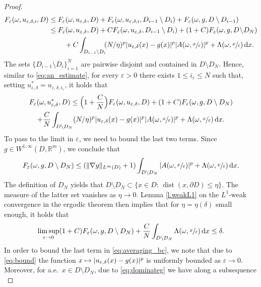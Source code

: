 \documentclass[10pt]{amsart}
\def\mto{\mathchoice{\longmapsto}{\mapsto}{\mapsto}{\mapsto}}
\theoremstyle{definition}
\let\e\varepsilon
\let\w\omega
\newcommand{\dx}{\,\mathrm{d}x}
\DeclareMathOperator{\dist}{dist}
\newcommand{\R}{\mathbb{R}}
\begin{document}
\begin{proof}
\begin{align*}
F_{\e}(\w,u_{\e,\delta,i},D)&\leq F_{\e}(\w,u_{\e,\delta},D)+F_{\e}(\w,u_{\e,\delta,i},D_{i-1}\setminus D_i)+F_{\e}(\w,g,D\setminus D_{i-1})
\\
&\leq F_{\e}(\w,u_{\e,\delta},D)+C F_{\e}(\w,u_{\e,\delta},D_{i-1}\setminus D_i)+(1+C)F_{\e}(\w,g,D\!\setminus\! D_N)
\\
&\hspace*{.8cm} +C\int_{D_{i-1}\setminus D_i}\hspace*{-1mm}(N/\eta)^p |u_{\e,\delta}(x)-g(x)|^p|A(\w,\sfrac{x}{\e})|^p+\Lambda(\w,\sfrac{x}{\e})\dx.
\end{align*}
The sets $\{D_{i-1}\setminus D_i\}_{i=1}^N$ are pairwise disjoint and contained in $D\setminus D_N$. Hence, similar to \eqref{eq:an_estimate}, for every $\e>0$ there exists $1\leq i_{\e}\leq N$ such that, setting $u^*_{\e,\delta}=u_{\e,\delta,i_{\e}}$, it holds that
\begin{multline}\label{eq:averaging_bc}
F_{\e}(\w,u_{\e,\delta}^*,D)\leq \Bigl(1+\frac{C}{N}\Bigr)F_{\e}(\w,u_{\e,\delta},D)+(1+C)F_{\e}(\w,g,D\setminus D_N)
\\
+\frac{C}{N}\int_{D\setminus D_N}(N/\eta)^p |u_{\e,\delta}(x)-g(x)|^p|A(\w,\sfrac{x}{\e})|^p+\Lambda(\w,\sfrac{x}{\e})\dx.
\end{multline}
To pass to the limit in $\e$, we need to bound the last two terms. Since $g\in W^{1,\infty}(D,\R^m)$, we conclude that
\begin{equation*}
F_{\e}(\w,g,D\setminus D_N)\leq (\|\nabla g\|_{L^{\infty}(D)}+1)\int_{D\setminus D_N}|A(\w,\sfrac{x}{\e})|^p+\Lambda(\w,\sfrac{x}{\e})\dx.
\end{equation*}
The definition of $D_N$ yields that $D\setminus D_N\subset \{x\in D:\,\dist(x,\partial D)\leq \eta\}$. The measure of the latter set vanishes as $\eta\to 0$. Lemma \ref{l.weakL1} on the $L^1$-weak convergence in the ergodic theorem then implies that for $\eta=\eta(\delta)$ small enough, it holds that
\begin{equation}\label{eq:control_g}
\limsup_{\e\to 0}(1+C)F_{\e}(\w,g,D\setminus D_N)+\frac{C}{N}\int_{D\setminus D_N}\Lambda(\w,\sfrac{x}{\e})\dx\leq\delta.
\end{equation}
In order to bound the last term in \eqref{eq:averaging_bc}, we note that due to \eqref{eq:bound} the function $x\mto |u_{\e,\delta}(x)-g(x)|^p$ is uniformly bounded as $\e\to 0$. Moreover, for a.e.\ $x\in D\setminus D_N$, due to \eqref{eq:dominateg} we have along a subsequence
\begin{equation*}

\end{equation*}
\end{proof}
\end{document}
